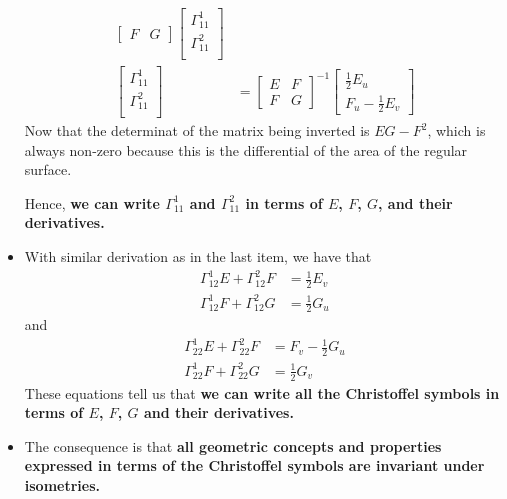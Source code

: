 \documentclass[10pt]{article}
\begin{document}
\begin{itemize}
\begin{align*}
\begin{bmatrix}
        F & G
      \end{bmatrix}
      \begin{bmatrix}
        \Gamma_{11}^1\\
        \Gamma_{11}^2\\
      \end{bmatrix}\\
      \begin{bmatrix}
        \Gamma_{11}^1\\
        \Gamma_{11}^2\\
      \end{bmatrix}
      &=
      \begin{bmatrix}
        E & F\\
        F & G
      \end{bmatrix}^{-1}
      \begin{bmatrix}
        \frac{1}{2}E_u \\
        F_u - \frac{1}{2} E_v        
      \end{bmatrix}
    \end{align*}
    Now that the determinat of the matrix being inverted is $EG-F^2$, which is always non-zero because this is the differential of the area of the regular surface. 

    Hence, {\bf we can write $\Gamma_{11}^1$ and $\Gamma_{11}^2$ in terms of $E$, $F$, $G$, and their derivatives.}

    \item With similar derivation as in the last item, we have that 
    \begin{align*}
      \Gamma_{12}^1 E + \Gamma_{12}^2 F &= \frac{1}{2} E_v\\
      \Gamma_{12}^1 F + \Gamma_{12}^2 G &= \frac{1}{2} G_u
    \end{align*}
    and
    \begin{align*}
      \Gamma_{22}^1 E + \Gamma_{22}^2 F &= F_v - \frac{1}{2} G_u\\
      \Gamma_{22}^1 F + \Gamma_{22}^2 G &= \frac{1}{2} G_v
    \end{align*}
    These equations tell us that {\bf we can write all the Christoffel symbols in terms of $E$, $F$, $G$ and their derivatives.}

    \item The consequence is that {\bf all geometric concepts and properties expressed in terms of the Christoffel symbols are invariant under isometries.}
  \end{itemize}
\end{document}
